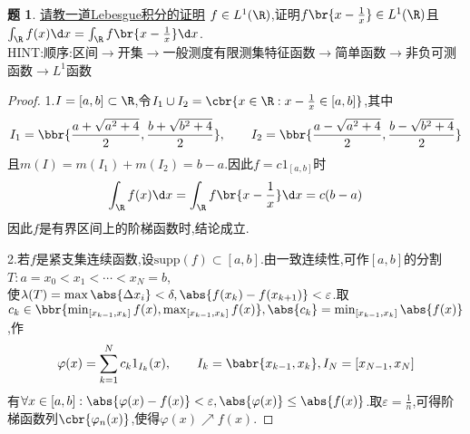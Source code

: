 \documentclass{article}
\theoremstyle{definition}
\newtheorem{exercise}{题}[section]
\begin{document}
\begin{exercise}
    \href{https://chaoli.club/index.php/8065}{请教一道Lebesgue积分的证明}
    $f\in L^1(\R)$,证明$f\br{x-\frac{1}{x}}\in L^1(\R)$且$\int_{\R}f(x)\d x=\int_{\R}f\br{x-\frac{1}{x}}\d x$.\\
    HINT:顺序:区间$\to$开集$\to$一般测度有限测集特征函数$\to$简单函数$\to$非负可测函数$\to L^1$函数
\end{exercise}
\begin{proof}
    1.$I=[a,b]\subset \R$,令$I_1\cup I_2=\cbr{x\in \R:x-\frac{1}{x}\in [a,b]}$,其中$$I_1=\bbr{\frac{a+\sqrt{a^2+4}}{2},\frac{b+\sqrt{b^2+4}}{2}},\qquad I_2=\bbr{\frac{a-\sqrt{a^2+4}}{2},\frac{b-\sqrt{b^2+4}}{2}}$$
    且$m(I)=m(I_1)+m(I_2)=b-a$.因此$f=c1_{[a,b]}$时$$\int_{\R}f(x)\d x=\int_{\R}f\br{x-\frac{1}{x}}\d x=c(b-a)$$
    因此$f$是有界区间上的阶梯函数时,结论成立.

    2.若$f$是紧支集连续函数,设$\mathrm{supp}(f)\subset [a,b]$.由一致连续性,可作$[a,b]$的分割$T:a=x_0<x_1<\cdots<x_N=b$,\\使$\lambda(T)=\max \abs{\Delta x_i}<\delta, \abs{f(x_k)-f(x_{k+1})}<\varepsilon$.取$c_k\in \bbr{\min_{[x_{k-1},x_k]}f(x), \max_{[x_{k-1},x_k]}f(x)}, \abs{c_k}=\min_{[x_{k-1},x_k]}\abs{f(x)}$,作$$\varphi(x)=\sum_{k=1}^N c_k1_{I_k}(x),\qquad I_k=\babr{x_{k-1},x_k}, I_N=[x_{N-1},x_N]$$
    有$\forall x\in [a,b]:\abs{\varphi(x)-f(x)}<\varepsilon, \abs{\varphi(x)}\leq \abs{f(x)}$.取$\varepsilon=\frac{1}{n}$,可得阶梯函数列$\cbr{\varphi_n(x)}$,使得$\varphi(x)\nearrow f(x)$.
    
    \tbc
\end{proof}
\end{document}
